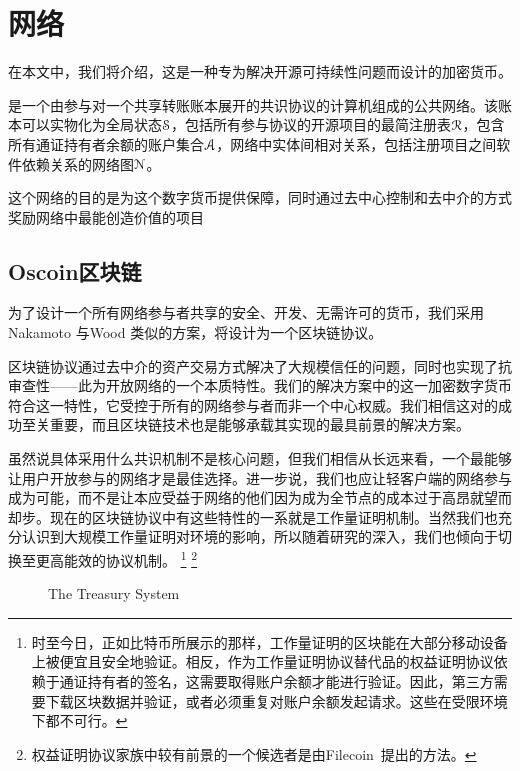 \section{\Oscoin{}网络}
\label{s:oscoin}

\noindent 在本文中，我们将介绍\oscoin{}，这是一种专为解决开源可持续性问题而设计的加密货币。

\Oscoin{} 是一个由参与对一个共享转账账本展开的共识协议的计算机组成的公共网络。该账本可以实物化为全局状态$\mathcal{S}$，包括所有参与协议的开源项目的最简注册表$\mathcal{R}$，包含所有通证持有者余额的账户集合$\mathcal{A}$，网络中实体间相对关系，包括注册项目之间软件依赖关系的网络图$\mathcal{N}$。

这个网络的目的是为\oscoin{}这个数字货币提供保障，同时通过去中心控制和去中介的方式奖励网络中最能创造价值的项目

\subsection{Oscoin区块链}

为了设计一个所有网络参与者共享的安全、开发、无需许可的货币，我们采用Nakamoto \cite{bitcoin}与Wood \cite{ethereum}类似的方案，将\oscoin{}设计为一个区块链协议。

区块链协议通过去中介的资产交易方式解决了大规模信任的问题，同时也实现了抗审查性——此为开放网络的一个本质特性。我们的解决方案中的\oscoin{}这一加密数字货币符合这一特性，它受控于所有的网络参与者而非一个中心权威。我们相信这对\oscoin{}的成功至关重要，而且区块链技术也是能够承载其实现的最具前景的解决方案。

虽然说\oscoin{}具体采用什么共识机制不是核心问题，但我们相信从长远来看，一个最能够让用户开放参与的网络才是最佳选择。进一步说，我们也应让轻客户端的网络参与成为可能，而不是让本应受益于网络的他们因为成为全节点的成本过于高昂就望而却步。现在的区块链协议中有这些特性的一系就是工作量证明机制。当然我们也充分认识到大规模工作量证明对环境的影响，所以随着研究的深入，我们也倾向于切换至更高能效的协议机制。
\footnote{时至今日，正如比特币所展示的那样，工作量证明的区块能在大部分移动设备上被便宜且安全地验证。相反，作为工作量证明协议替代品的权益证明协议依赖于通证持有者的签名，这需要取得账户余额才能进行验证。因此，第三方需要下载区块数据并验证，或者必须重复对账户余额发起请求。这些在受限环境下都不可行。}
\footnote{权益证明协议家族中较有前景的一个候选者是由Filecoin~\cite{filecoin}提出的方法。}

\begin{figure*}[!ht]
    \par\medskip\noindent\minipage{\linewidth}
    \centering
    
    \caption{The \Oscoin{} Treasury System\label{f:treasury}}
    \endminipage\par\medskip
\end{figure*}

